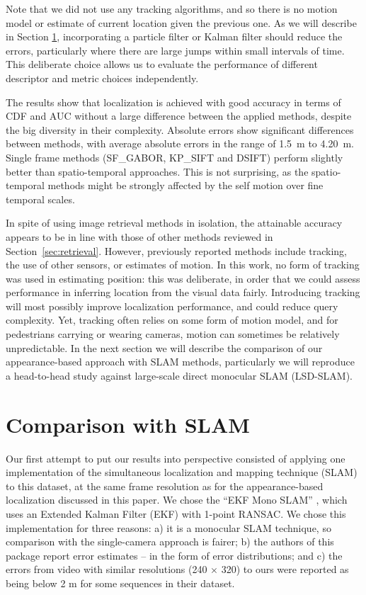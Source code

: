 Note that we did not use any tracking algorithms, and so there is no motion model or estimate of current location given the previous one. As we will describe in Section \ref{sec:slamcomp}, incorporating a particle filter or Kalman filter should reduce the errors, particularly where there are large jumps within small intervals of time. This deliberate choice allows us to evaluate the performance of different descriptor and metric choices independently.

The results show that localization is achieved with good accuracy in terms of CDF and AUC without a large difference between the applied methods, despite the big diversity in their complexity. Absolute errors show significant differences between methods, with average absolute errors in the range of \SI{1.5}{m} to \SI{4.20}{m}. Single frame methods (SF\_GABOR, KP\_SIFT and DSIFT) perform slightly better than spatio-temporal approaches. This is not surprising, as the spatio-temporal methods might be strongly affected by the self motion over fine temporal scales.

In spite of using image retrieval methods in isolation, the attainable accuracy appears to be in line with those of  other methods reviewed in Section~\ref{sec:retrieval}.  However, previously reported methods include tracking, the use of other sensors, or estimates of motion. In this work, no form of tracking was used in estimating position: this was deliberate, in order that we could assess performance in inferring location from the visual data fairly.  Introducing tracking will most possibly improve localization performance, and could reduce query complexity. Yet, tracking often relies on some form of motion model, and for pedestrians carrying or wearing cameras, motion can sometimes be relatively unpredictable. In the next section we will describe the comparison  of our appearance-based approach with SLAM methods, particularly we will reproduce a head-to-head study against large-scale direct monocular SLAM (LSD-SLAM).

\section{Comparison with SLAM}
\label{sec:slamcomp}

Our first attempt to put our results into perspective consisted of applying one implementation of the simultaneous localization and mapping technique (SLAM) to this dataset, at the same frame resolution as for the appearance-based  localization discussed in this paper. We chose the ``EKF Mono SLAM'' \citep{Civera}, which uses an Extended Kalman Filter (EKF) with 1-point RANSAC.  We chose this implementation for three reasons: a) it is a monocular SLAM technique, so comparison with the single-camera approach is fairer; b) the authors of this package report error estimates -- in the form of error distributions; and c) the errors from video with similar resolutions (240 $\times$ 320) to ours were reported as being below 2 m for some sequences \citep{Civera} in their dataset.

